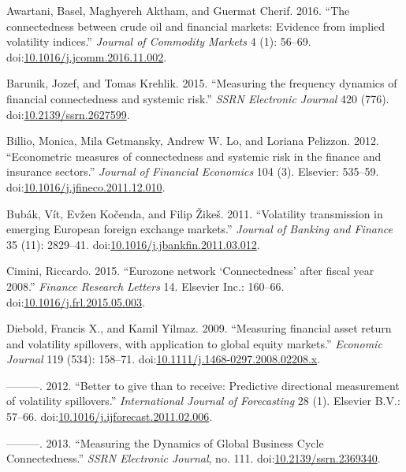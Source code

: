 \documentclass[]{elsarticle} %
\begin{document}
\hypertarget{ref-Awartani2016}{}
Awartani, Basel, Maghyereh Aktham, and Guermat Cherif. 2016. ``The
connectedness between crude oil and financial markets: Evidence from
implied volatility indices.'' \emph{Journal of Commodity Markets} 4 (1):
56--69.
doi:\href{https://doi.org/10.1016/j.jcomm.2016.11.002}{10.1016/j.jcomm.2016.11.002}.

\hypertarget{ref-Barunik2015}{}
Barunik, Jozef, and Tomas Krehlik. 2015. ``Measuring the frequency
dynamics of financial connectedness and systemic risk.'' \emph{SSRN
Electronic Journal} 420 (776).
doi:\href{https://doi.org/10.2139/ssrn.2627599}{10.2139/ssrn.2627599}.

\hypertarget{ref-Billio2012}{}
Billio, Monica, Mila Getmansky, Andrew W. Lo, and Loriana Pelizzon.
2012. ``Econometric measures of connectedness and systemic risk in the
finance and insurance sectors.'' \emph{Journal of Financial Economics}
104 (3). Elsevier: 535--59.
doi:\href{https://doi.org/10.1016/j.jfineco.2011.12.010}{10.1016/j.jfineco.2011.12.010}.

\hypertarget{ref-Bubak2011}{}
Bubák, Vít, Evžen Kočenda, and Filip Žikeš. 2011. ``Volatility
transmission in emerging European foreign exchange markets.''
\emph{Journal of Banking and Finance} 35 (11): 2829--41.
doi:\href{https://doi.org/10.1016/j.jbankfin.2011.03.012}{10.1016/j.jbankfin.2011.03.012}.

\hypertarget{ref-Cimini2015}{}
Cimini, Riccardo. 2015. ``Eurozone network `Connectedness' after fiscal
year 2008.'' \emph{Finance Research Letters} 14. Elsevier Inc.: 160--66.
doi:\href{https://doi.org/10.1016/j.frl.2015.05.003}{10.1016/j.frl.2015.05.003}.

\hypertarget{ref-Diebold2009}{}
Diebold, Francis X., and Kamil Yilmaz. 2009. ``Measuring financial asset
return and volatility spillovers, with application to global equity
markets.'' \emph{Economic Journal} 119 (534): 158--71.
doi:\href{https://doi.org/10.1111/j.1468-0297.2008.02208.x}{10.1111/j.1468-0297.2008.02208.x}.

\hypertarget{ref-Diebold2012}{}
---------. 2012. ``Better to give than to receive: Predictive
directional measurement of volatility spillovers.'' \emph{International
Journal of Forecasting} 28 (1). Elsevier B.V.: 57--66.
doi:\href{https://doi.org/10.1016/j.ijforecast.2011.02.006}{10.1016/j.ijforecast.2011.02.006}.

\hypertarget{ref-Diebold2013}{}
---------. 2013. ``Measuring the Dynamics of Global Business Cycle
Connectedness.'' \emph{SSRN Electronic Journal}, no. 111.
doi:\href{https://doi.org/10.2139/ssrn.2369340}{10.2139/ssrn.2369340}.
\end{document}
